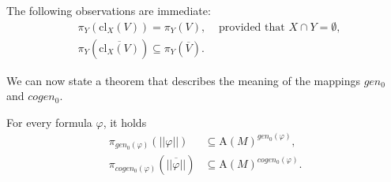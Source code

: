 \documentclass{lmcs}
\def\A{\textrm{A}}
\def\cl{\textrm{cl}}
\def\gen{gen}
\def\cogen{cogen}
\def\genz{\gen_0}
\def\cogenz{\cogen_0}
\begin{document}
The following observations are immediate:
\begin{align}
&\pi_Y(\cl_X(V))=\pi_Y(V),&\textrm{ provided that } X\cap Y=\emptyset, \label{eq:pi_C_disjoint}\\
&\pi_Y(\overline{\cl_X(V)})\subseteq\pi_Y(\overline{V}).& \label{eq:pi_overline_C}
\end{align}

We can now state a theorem that describes the meaning of the mappings $\genz$ and $\cogenz$.
\begin{thm}
For every formula $\varphi$, it holds
\begin{align*}
\pi_{\genz(\varphi)}(||\varphi||)&\subseteq \A(M)^{\genz(\varphi)},\\
\pi_{\cogenz(\varphi)}(\overline{||\varphi||})&\subseteq \A(M)^{\cogenz(\varphi)}. 
\end{align*}
\end{thm}
\end{document}
